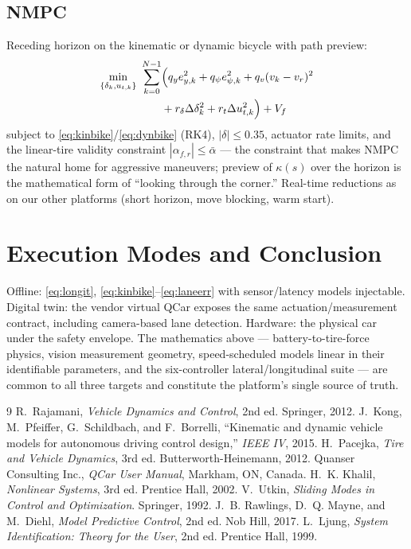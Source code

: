 \documentclass[conference]{IEEEtran}
\begin{document}
\subsection{NMPC}
Receding horizon on the kinematic or dynamic bicycle with path preview:
\begin{align}
\min_{\{\delta_k, u_{t,k}\}}\ \sum_{k=0}^{N-1}& \Bigl( q_y e_{y,k}^2 + q_\psi e_{\psi,k}^2 + q_v (v_k - v_r)^2 \nonumber\\
&+ r_\delta \Delta\delta_k^2 + r_t \Delta u_{t,k}^2 \Bigr) + V_f
\end{align}
subject to \eqref{eq:kinbike}/\eqref{eq:dynbike} (RK4), $|\delta|\le0.35$, actuator rate limits, and the linear-tire validity constraint $|\alpha_{f,r}|\le\bar\alpha$ --- the constraint that makes NMPC the natural home for aggressive maneuvers; preview of $\kappa(s)$ over the horizon is the mathematical form of ``looking through the corner.'' Real-time reductions as on our other platforms (short horizon, move blocking, warm start).

\section{Execution Modes and Conclusion}
Offline: \eqref{eq:longit}, \eqref{eq:kinbike}--\eqref{eq:laneerr} with sensor/latency models injectable. Digital twin: the vendor virtual QCar exposes the same actuation/measurement contract, including camera-based lane detection. Hardware: the physical car under the safety envelope. The mathematics above --- battery-to-tire-force physics, vision measurement geometry, speed-scheduled models linear in their identifiable parameters, and the six-controller lateral/longitudinal suite --- are common to all three targets and constitute the platform's single source of truth.


\begin{thebibliography}{9}
 R.~Rajamani, \emph{Vehicle Dynamics and Control}, 2nd ed. Springer, 2012.
 J.~Kong, M.~Pfeiffer, G.~Schildbach, and F.~Borrelli, ``Kinematic and dynamic vehicle models for autonomous driving control design,'' \emph{IEEE IV}, 2015.
 H.~Pacejka, \emph{Tire and Vehicle Dynamics}, 3rd ed. Butterworth-Heinemann, 2012.
 Quanser Consulting Inc., \emph{QCar User Manual}, Markham, ON, Canada.
 H.~K. Khalil, \emph{Nonlinear Systems}, 3rd ed. Prentice Hall, 2002.
 V.~Utkin, \emph{Sliding Modes in Control and Optimization}. Springer, 1992.
 J.~B. Rawlings, D.~Q. Mayne, and M.~Diehl, \emph{Model Predictive Control}, 2nd ed. Nob Hill, 2017.
 L.~Ljung, \emph{System Identification: Theory for the User}, 2nd ed. Prentice Hall, 1999.
\end{thebibliography}
\end{document}
